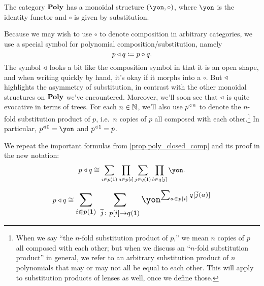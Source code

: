 \documentclass[Book-Poly]{subfiles}
\begin{document}

\begin{corollary} \label{cor.comp_monoidal}
The category $\mathbf{Poly}$ has a monoidal structure $(\yon,\circ)$, where $\yon$ is the identity functor and $\circ$ is given by substitution.
\end{corollary}


Because we may wish to use $\circ$ to denote composition in arbitrary categories, we use a special symbol for polynomial composition/substitution, namely
\[
p\mathbin{\triangleleft} q\coloneqq p\circ q.
\]
The symbol $\mathbin{\triangleleft}$ looks a bit like the composition symbol in that it is an open shape, and when writing quickly by hand, it's okay if it morphs into a $\circ$.
But $\mathbin{\triangleleft}$ highlights the asymmetry of substitution, in contrast with the other monoidal structures on $\mathbf{Poly}$ we've encountered.
Moreover, we'll soon see that $\mathbin{\triangleleft}$ is quite evocative in terms of trees.
For each $n\in\mathbb{N}$, we'll also use $p^{\mathbin{\triangleleft}\,n}$ to denote the $n$-fold substitution product of $p$, i.e.\ $n$ copies of $p$ all composed with each other.\footnote{When we say ``the $n$-fold substitution product of $p$,'' we mean $n$ copies of $p$ all composed with each other; but when we discuss an ``$n$-fold substitution product'' in general, we refer to an arbitrary substitution product of $n$ polynomials that may or may not all be equal to each other. This will apply to substitution products of lenses as well, once we define those.}
In particular, $p\tripow0=\yon$ and $p^{\mathbin{\triangleleft}\,1}=p$.

We repeat the important formulas from \cref{prop.poly_closed_comp} and its proof in the new notation:
\begin{equation}\label{eqn.composite_formula}
p\tri q\iso\sum_{i\in p(\1)}\prod_{a\in p[i]}\sum_{j\in q(\1)}\prod_{b\in q[j]}\yon.
\end{equation}

\begin{align}\label{eqn.composite_formula_sums_first}
  p\tri q\iso
  \scalebox{1.3}{$\displaystyle
  \sum_{i\in p(\1)} \; \sum_{\ol{j}\colon p[i]\to q(\1)}\yon^{\sum_{a\in p[i]}q[\ol{j}(a)]}$}
\end{align}

\end{document}
